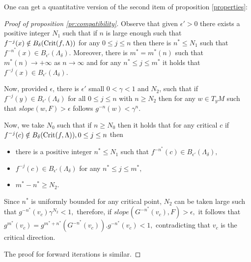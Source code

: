 \documentclass[a4paper,11pt]{article}
\newtheorem{lemma}{Lemma}
\theoremstyle{definition}
\def\La{\Lambda}
\def\eps{\epsilon}
\def\ga{\gamma}
\def\de{\delta}
\def\La{\Lambda}
\def\eps{\epsilon}
\begin{document}
One can get a quantitative version of  the second item of proposition \ref{properties}:










\begin{proof}[Proof of  proposition \ref{pr:compatibility}] Observe that given $\eps'>0$ there exists a positive integer $N_1$ such that if $n$ is large enough such that $f^{-j}(x)\notin B_\de({\rm Crit}(f,\La))$ for any $0\leq j\leq n$ then there is $n^*\leq N_1$ such that $f^{-n^*}(x)\in B_{\eps'}(\La_\de).$ Moreover, there is $m^*= m^*(n)$ such that $m^*(n)\to +\infty$ as $n\to \infty$ and for any $n^*\leq  j \leq m^*$ it holds that $f^{-j}(x)\in B_{\eps'}(\La_\de).$

Now, provided $\eps$, there is  $\eps'$ small $0<\ga<1$ and  $N_2$, such  that if  $f^{-j}(y)\in B_{\eps'}(\La_\de)$ for all $0\leq j\leq n$ with $n\geq N_2$ then for any $w\in T_yM$ such that $slope(w, F)>\eps$ follows $g^{-n}(w)<\ga^n.$

Now, we take $N_0$ such that if $n\geq N_0$ then it holds that for any critical $c$ if $f^{-j}(c)\notin B_\de({\rm Crit}(f,\La)), 0\leq j\leq n$ then 
\begin{itemize}
    \item[--] there is a positive integer $n^*\leq N_1$ such that  $f^{-n^*}(c)\in B_{\eps'}(\La_\de),$
    \item[--] $f^{-j}(c)\in B_{\eps'}(\La_\de)$ for any $n^*\leq j\leq m^*,$
    \item[--] $m^*-n^*\geq N_2.$
\end{itemize}
Since $n^*$ is uniformly bounded for any critical point, $N_2$ can be taken large such that  $g^{-n^*}(v_c)\ga^{N_2}<1,$ therefore, if $slope(G^{-n^*}(v_c), F)>\eps,$ it follows that  $g^{m^*}(v_c)= g^{m^*+n^*}(G^{-n^*}(v_c)).g^{-n^*}(v_c)<1,$ contradicting that $v_c$ is the critical direction.

The proof for forward iterations is similar.

\end{proof}
\end{document}
